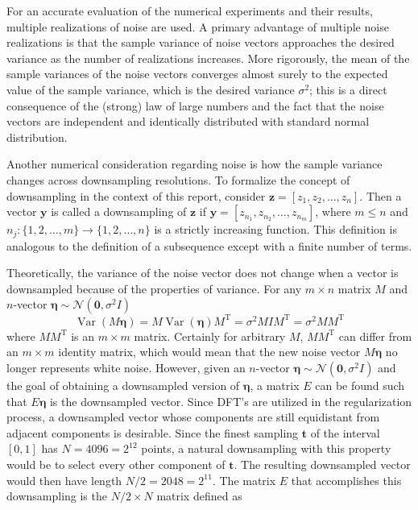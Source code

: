 \documentclass[12pt]{article}
\newcommand{\tdis}{\mathbf{t}}
\newcommand{\trans}{\mathrm{T}}	%
\newcommand{\noiseSD}{\sigma}	%
\newcommand{\noise}{\bm{\eta}}	%
\newcommand{\Var}{\operatorname{Var}}	%
\begin{document}
For an accurate evaluation of the numerical experiments and their results, multiple realizations of noise are used. A primary advantage of multiple noise realizations is that the sample variance of noise vectors approaches the desired variance as the number of realizations increases. More rigorously, the mean of the sample variances of the noise vectors converges almost surely to the expected value of the sample variance, which is the desired variance $\noiseSD^2$; this is a direct consequence of the (strong) law of large numbers and the fact that the noise vectors are independent and identically distributed with standard normal distribution.  \par
Another numerical consideration regarding noise is how the sample variance changes across downsampling resolutions. To formalize the concept of downsampling in the context of this report, consider $\mathbf{z} = [z_1,z_2,\ldots,z_n]$. Then a vector $\mathbf{y}$ is called a downsampling of $\mathbf{z}$ if $\mathbf{y} = [z_{n_1},z_{n_2},\ldots,z_{n_m}]$, where $m \leq n$ and $n_j:\{1,2,\ldots,m\}\rightarrow\{1,2,\ldots,n\}$ is a strictly increasing function. This definition is analogous to the definition of a subsequence except with a finite number of terms. \par
Theoretically, the variance of the noise vector does not change when a vector is downsampled because of the properties of variance. For any $m\times n$ matrix $M$ and $n$-vector $\noise \sim \mathcal{N}(\bm{0},\noiseSD^2I)$
\begin{equation}
\Var(M\noise) = M\Var(\noise)M^{\trans} = \noiseSD^2MIM^{\trans} = \noiseSD^2MM^{\trans}
\label{Eq_VarProp}
\end{equation}
where $MM^\trans$ is an $m \times m$ matrix. Certainly for arbitrary $M$, $MM^\trans$ can differ from an $m \times m$ identity matrix, which would mean that the new noise vector $M\noise$ no longer represents white noise. However, given an $n$-vector $\noise \sim \mathcal{N}(\bm{0},\noiseSD^2I)$ and the goal of obtaining a downsampled version of $\noise$, a matrix $E$ can be found such that $E\noise$ is the downsampled vector. Since DFT's are utilized in the regularization process, a downsampled vector whose components are still equidistant from adjacent components is desirable. Since the finest sampling $\tdis$ of the interval $[0,1]$ has $N = 4096 = 2^{12}$ points, a natural downsampling with this property would be to select every other component of $\tdis$. The resulting downsampled vector would then have length $N/2 = 2048 = 2^{11}$. The matrix $E$ that accomplishes this downsampling is the $N/2 \times N$ matrix defined as
\end{document}
